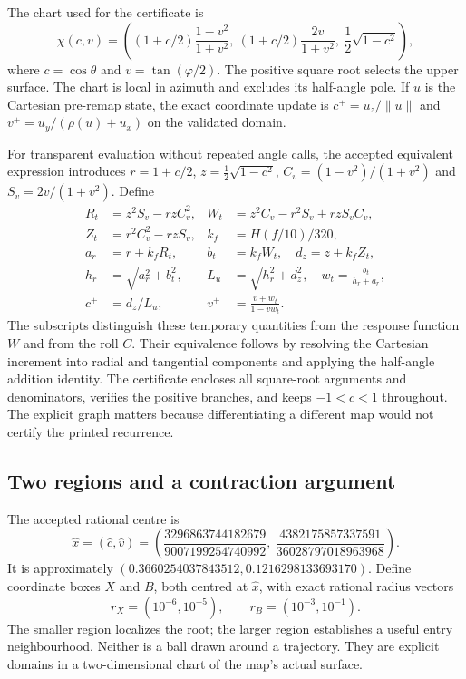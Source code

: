 \documentclass[11pt,a4paper]{article}
\numberwithin{equation}{section}
\begin{document}
The chart used for the certificate is
\begin{equation}\label{eq:chart}
\chi(c,v)=\left((1+c/2)\frac{1-v^2}{1+v^2},\ (1+c/2)\frac{2v}{1+v^2},\ \frac12\sqrt{1-c^2}\right),
\end{equation}
where $c=\cos\theta$ and $v=\tan(\varphi/2)$. The positive square root selects the upper surface. The chart is local in azimuth and excludes its half-angle pole. If $u$ is the Cartesian pre-remap state, the exact coordinate update is $c^+=u_z/\|u\|$ and $v^+=u_y/(\rho(u)+u_x)$ on the validated domain.

For transparent evaluation without repeated angle calls, the accepted equivalent expression introduces $r=1+c/2$, $z=\tfrac12\sqrt{1-c^2}$, $C_v=(1-v^2)/(1+v^2)$ and $S_v=2v/(1+v^2)$. Define
\begin{equation}\label{eq:chartstep}
\begin{aligned}
R_t&=z^2S_v-rzC_v^2,& W_t&=z^2C_v-r^2S_v+rzS_vC_v,\\
Z_t&=r^2C_v^2-rzS_v,& k_f&=H(f/10)/320,\\
a_r&=r+k_fR_t,& b_t&=k_fW_t,\quad d_z=z+k_fZ_t,\\
h_r&=\sqrt{a_r^2+b_t^2},& L_u&=\sqrt{h_r^2+d_z^2},\quad w_t=\frac{b_t}{h_r+a_r},\\
c^+&=d_z/L_u,& v^+&=\frac{v+w_t}{1-vw_t}.
\end{aligned}
\end{equation}
The subscripts distinguish these temporary quantities from the response function $W$ and from the roll $C$. Their equivalence follows by resolving the Cartesian increment into radial and tangential components and applying the half-angle addition identity. The certificate encloses all square-root arguments and denominators, verifies the positive branches, and keeps $-1<c<1$ throughout. The explicit graph matters because differentiating a different map would not certify the printed recurrence.

\subsection{Two regions and a contraction argument}
The accepted rational centre is
\begin{equation}\label{eq:center}
\widehat x=(\widehat c,\widehat v)=
\left(\frac{3296863744182679}{9007199254740992},\ 
\frac{4382175857337591}{36028797018963968}\right).
\end{equation}
It is approximately $(0.3660254037843512,0.1216298133693170)$. Define coordinate boxes $X$ and $B$, both centred at $\widehat x$, with exact rational radius vectors
\begin{equation}\label{eq:radii}
r_X=(10^{-6},10^{-5}),\qquad r_B=(10^{-3},10^{-1}).
\end{equation}
The smaller region localizes the root; the larger region establishes a useful entry neighbourhood. Neither is a ball drawn around a trajectory. They are explicit domains in a two-dimensional chart of the map's actual surface.
\end{document}
